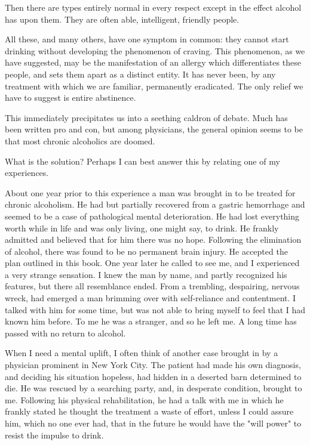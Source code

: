 {\begin{biblechapter}
\verse Then there are types entirely normal in every respect 
    except in the effect alcohol has upon them. 
\verse They are often able, intelligent, friendly people.

\verse All these, and many others, have one symptom in common: 
    they cannot start drinking without developing the phenomenon of craving. 
\verse This phenomenon, as we have suggested, 
    may be the manifestation of an allergy which differentiates these people, 
    and sets them apart as a distinct entity. 
\verse It has never been, by any treatment with which we are familiar, permanently eradicated. 
\verse The only relief we have to suggest is entire abstinence.

\verse This immediately precipitates us into a seething caldron of debate. 
\verse Much has been written pro and con, but among physicians, 
    the general opinion seems to be that most chronic alcoholics are doomed.
\end{biblechapter}


\begin{biblechapter}
    What is the solution? 
\verse Perhaps I can best answer this by relating one of my experiences.

\verse About one year prior to this experience 
    a man was brought in to be treated for chronic alcoholism. 
\verse He had but partially recovered from a gastric hemorrhage 
    and seemed to be a case of pathological mental deterioration. 
\verse He had lost everything worth while in life 
    and was only living, one might say, to drink. 
\verse He frankly admitted and believed that for him there was no hope. 
\verse Following the elimination of alcohol, there was found to be no permanent brain injury. 
\verse He accepted the plan outlined in this book. 
\verse One year later he called to see me, and I experienced a very strange sensation. 
\verse I knew the man by name, and partly recognized his features, 
    but there all resemblance ended. 
\verse From a trembling, despairing, nervous wreck, 
    had emerged a man brimming over with self-reliance and contentment. 
\verse I talked with him for some time, 
    but was not able to bring myself to feel that I had known him before. 
\verse To me he was a stranger, and so he left me. 
\verse A long time has passed with no return to alcohol.

\verse When I need a mental uplift, 
    I often think of another case brought in by a physician prominent in New York City. 
\verse The patient had made his own diagnosis, 
    and deciding his situation hopeless, 
    had hidden in a deserted barn determined to die. 
\verse He was rescued by a searching party, 
    and, in desperate condition, brought to me. 
\verse Following his physical rehabilitation, 
    he had a talk with me in which he frankly stated he thought the treatment a waste of effort, 
    unless I could assure him, which no one ever had, 
    that in the future he would have the "will power" to resist the impulse to drink.


\end{biblechapter}}
